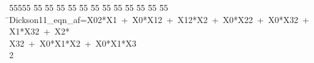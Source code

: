 %
%
\begin{tabbing}
55555 \= 55 \= 55 \= 55 \= 55 \= 55 \= 55 \= 55 \= 55 \= 55 \= 55 \= 55 \= 55 \= \>Dickson11\_eqn\_af=X02*X1\ +\ X0*X12\ +\ X12*X2\ +\ X0*X22\ +\ X0*X32\ +\ X1*X32\ +\ X2*\\[0pt]
\>X32\ +\ X0*X1*X2\ +\ X0*X1*X3\\[0pt]
2\>\end{tabbing}
